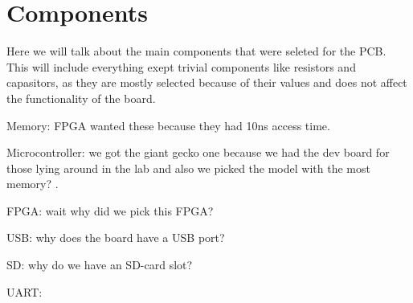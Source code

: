 \section {Components}

Here we will talk about the main components that were seleted for the PCB.
This will include everything exept trivial components like resistors and capasitors, as they are mostly selected because of their values and does not affect the functionality of the board.

Memory: FPGA wanted these because they had 10ns access time.

Microcontroller: we got the giant gecko one because we had the dev board for those lying around in the lab and also we picked the model with the most memory? .

FPGA: wait why did we pick this FPGA? 

USB: why does the board have a USB port? 

SD: why do we have an SD-card slot? 

UART: 

